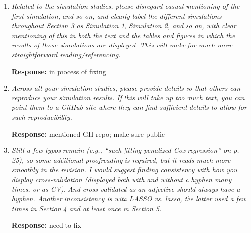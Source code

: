 \documentclass{article}
\newcommand{\re}{\textbf{Response: }}
\newcommand\pb[1]{{\color{red}#1}}
\begin{document}
\begin{enumerate}[align = left]
  \re \pb{explain this here; don't change paper}
  
\item \emph{Related to the simulation studies, please disregard casual mentioning of the first simulation, and so on, and clearly label the different simulations throughout Section 3 as Simulation 1, Simulation 2, and so on, with clear mentioning of this in both the text and the tables and figures in which the results of those simulations are displayed. This will make for much more straightforward reading/referencing.}

  \re \pb{in process of fixing}

\item \emph{Across all your simulation studies, please provide details so that others can reproduce your simulation results. If this will take up too much text, you can point them to a GitHub site where they can find sufficient details to allow for such reproducibility.}

  \re {mentioned GH repo; make sure public}

\item \emph{Still a few typos remain (e.g., “such fitting penalized Cox regression” on p. 25), so some additional proofreading is required, but it reads much more smoothly in the revision.  I would suggest finding consistency with how you display cross-validation (displayed both with and without a hyphen many times, or as CV).  And cross-validated as an adjective should always have a hyphen.  Another inconsistency is with LASSO vs. lasso, the latter used a few times in Section 4 and at least once in Section 5.}

  \re \pb{need to fix}


\end{enumerate}
\end{document}
